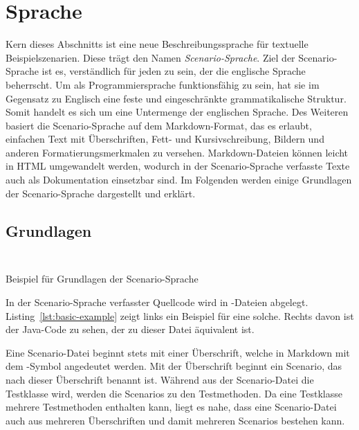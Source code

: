 \section{Sprache}\label{sec:language}

Kern dieses Abschnitts ist eine neue Beschreibungssprache für textuelle Beispielszenarien.
Diese trägt den Namen \emph{Scenario-Sprache}.
Ziel der Scenario-Sprache ist es, verständlich für jeden zu sein, der die englische Sprache beherrscht.
Um als Programmiersprache funktionsfähig zu sein, hat sie im Gegensatz zu Englisch eine feste und eingeschränkte grammatikalische Struktur.
Somit handelt es sich um eine Untermenge der englischen Sprache.
Des Weiteren basiert die Scenario-Sprache auf dem Markdown-Format, das es erlaubt, einfachen Text mit Überschriften, Fett- und Kursivschreibung, Bildern und anderen Formatierungsmerkmalen zu versehen.
Markdown-Dateien können leicht in HTML umgewandelt werden, wodurch in der Scenario-Sprache verfasste Texte auch als Dokumentation einsetzbar sind.
Im Folgenden werden einige Grundlagen der Scenario-Sprache dargestellt und erklärt.

\subsection{Grundlagen}\label{subsec:basics}

\begin{listing}[htp]
    \begin{minipage}{0.45\textwidth}
        \centering
        \inputminted{md}{chapter/fulib-scenarios/scenarios/Basic.md}
    \end{minipage}
    \hspace{0.05\textwidth}
    \begin{minipage}{0.45\textwidth}
        \centering
        \inputminted{java}{chapter/fulib-scenarios/java/BasicTest.java}
    \end{minipage}
    \caption{Beispiel für Grundlagen der Scenario-Sprache}
    \label{lst:basic-example}
\end{listing}

In der Scenario-Sprache verfasster Quellcode wird in -Dateien abgelegt.
Listing~\ref{lst:basic-example} zeigt links ein Beispiel für eine solche.
Rechts davon ist der Java-Code zu sehen, der zu dieser Datei äquivalent ist.

Eine Scenario-Datei beginnt stets mit einer Überschrift, welche in Markdown mit dem \mdcode{#}-Symbol angedeutet werden.
Mit der Überschrift beginnt ein Scenario, das nach dieser Überschrift benannt ist.
Während aus der Scenario-Datei die Testklasse wird, werden die Scenarios zu den Testmethoden.
Da eine Testklasse mehrere Testmethoden enthalten kann, liegt es nahe, dass eine Scenario-Datei auch aus mehreren Überschriften und damit mehreren Scenarios bestehen kann.

